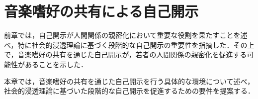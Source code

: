 \chapter{音楽嗜好の共有による自己開示}\label{世界観}
前章では，自己開示が人間関係の親密化において重要な役割を果たすことを述べ，特に社会的浸透理論に基づく段階的な自己開示の重要性を指摘した．その上で，音楽嗜好の共有を通じた自己開示が，若者の人間関係の親密化を促進する可能性があることを示した．

本章では，音楽嗜好の共有を通じた自己開示を行う具体的な環境について述べ，社会的浸透理論に基づいた段階的な自己開示を促進するための要件を提案する．






